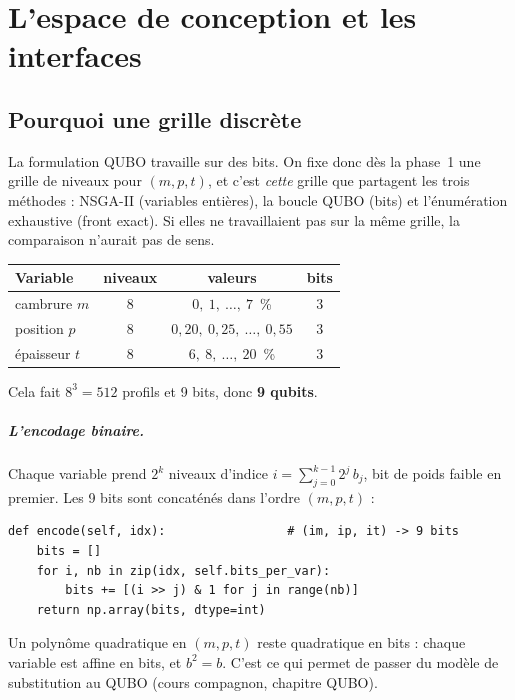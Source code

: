 \chapter{L'espace de conception et les interfaces}\label{ch:espace}

\section{Pourquoi une grille discrète}
La formulation QUBO travaille sur des bits. On fixe donc dès la phase~1 une grille de niveaux pour $(m,p,t)$, et c'est \emph{cette} grille que partagent les trois méthodes : NSGA-II (variables entières), la boucle QUBO (bits) et l'énumération exhaustive (front exact). Si elles ne travaillaient pas sur la même grille, la comparaison n'aurait pas de sens.

\begin{center}
\begin{tabular}{lccc}
\toprule
Variable & niveaux & valeurs & bits \\
\midrule
cambrure $m$ & 8 & $0,\ 1,\ \dots,\ 7$~\% & 3 \\
position $p$ & 8 & $0{,}20,\ 0{,}25,\ \dots,\ 0{,}55$ & 3 \\
épaisseur $t$ & 8 & $6,\ 8,\ \dots,\ 20$~\% & 3 \\
\bottomrule
\end{tabular}
\end{center}
Cela fait $8^3=512$ profils et 9 bits, donc \textbf{9 qubits}.

\paragraph{L'encodage binaire.} Chaque variable prend $2^k$ niveaux d'indice $i=\sum_{j=0}^{k-1}2^j\,b_j$, bit de poids faible en premier. Les 9 bits sont concaténés dans l'ordre $(m,p,t)$ :
\begin{lstlisting}
def encode(self, idx):                 # (im, ip, it) -> 9 bits
    bits = []
    for i, nb in zip(idx, self.bits_per_var):
        bits += [(i >> j) & 1 for j in range(nb)]
    return np.array(bits, dtype=int)
\end{lstlisting}
Un polynôme quadratique en $(m,p,t)$ reste quadratique en bits : chaque variable est affine en bits, et $b^2=b$. C'est ce qui permet de passer du modèle de substitution au QUBO (cours compagnon, chapitre QUBO).


